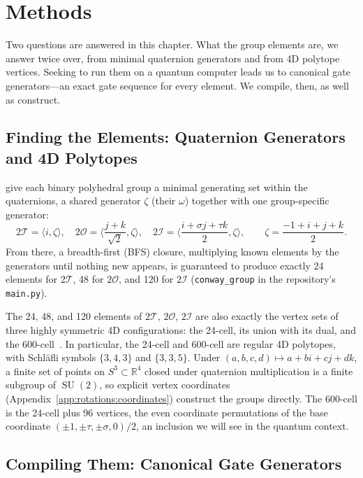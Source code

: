 \documentclass[11pt, oneside, openany]{scrbook}
\DeclareMathOperator{\SU}{SU}
\newcommand{\Tgroup}{\mathcal{T}}  %
\newcommand{\Ogroup}{\mathcal{O}}  %
\newcommand{\Igroup}{\mathcal{I}}  %
\newcommand{\TwoT}{2\Tgroup}
\newcommand{\TwoO}{2\Ogroup}
\newcommand{\TwoI}{2\Igroup}
\newcommand{\phig}{\tau} %
\newcommand{\invphig}{\sigma} %
\begin{document}
\chapter{Methods} \label{cha:methods}

Two questions are answered in this chapter. What the group elements are, we answer twice over, from minimal quaternion generators and from 4D polytope vertices. Seeking to run them on a quantum computer leads us to canonical gate generators---an exact gate sequence for every element. We compile, then, as well as construct.

\section{Finding the Elements: Quaternion Generators and 4D Polytopes} \label{sec:constructingthebpg}

\textcite[\S3.5]{conway2009quaternionsoctonionstheir} give each binary polyhedral group a minimal generating set within the quaternions, a shared generator $\zeta$ (their $\omega$) together with one group-specific generator:
\[
    \TwoT = \langle i, \zeta \rangle, \quad \TwoO = \langle \frac{j+k}{\sqrt{2}}, \zeta \rangle, \quad \TwoI = \langle \frac{i + \invphig j + \phig k}{2}, \zeta \rangle, \qquad \zeta = \frac{-1+i+j+k}{2}.
\]
From there, a breadth-first (BFS) closure, multiplying known elements by the generators until nothing new appears, is guaranteed to produce exactly 24 elements for $\TwoT$, 48 for $\TwoO$, and 120 for $\TwoI$ (\texttt{conway\_group} in the repository's \texttt{main.py}).

\label{sec:construction4dpolytopes}The 24, 48, and 120 elements of $\TwoT$, $\TwoO$, $\TwoI$ are also exactly the vertex sets of three highly symmetric 4D configurations: the 24-cell, its union with its dual, and the 600-cell~\cite{coxeter1973regularpolytopes, dechant2013platonicsolidsgenerate}. In particular, the 24-cell and 600-cell are regular 4D polytopes, with Schl\"{a}fli symbols $\{3,4,3\}$ and $\{3,3,5\}$. Under $(a, b, c, d) \mapsto a + bi + cj + dk$, a finite set of points on $S^3 \subset \mathbb{R}^4$ closed under quaternion multiplication is a finite subgroup of $\SU(2)$, so explicit vertex coordinates (Appendix~\ref{app:rotations:coordinates}) construct the groups directly. The 600-cell is the 24-cell plus 96 vertices, the even coordinate permutations of the base coordinate $(\pm 1, \pm \phig, \pm \invphig, 0)/2$, an inclusion we will see in the quantum context.

\section{Compiling Them: Canonical Gate Generators}
\end{document}
